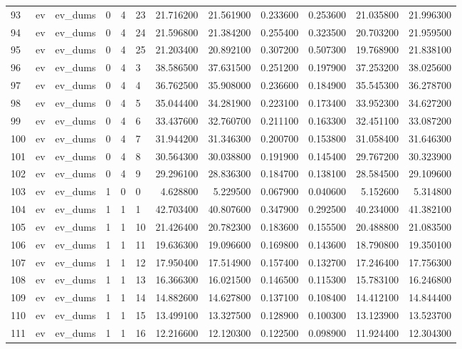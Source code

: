\begin{tabular}{llllllrrrrrr}
93 & ev & ev_dums & 0 & 4 & 23 & 21.716200 & 21.561900 & 0.233600 & 0.253600 & 21.035800 & 21.996300 \\
94 & ev & ev_dums & 0 & 4 & 24 & 21.596800 & 21.384200 & 0.255400 & 0.323500 & 20.703200 & 21.959500 \\
95 & ev & ev_dums & 0 & 4 & 25 & 21.203400 & 20.892100 & 0.307200 & 0.507300 & 19.768900 & 21.838100 \\
96 & ev & ev_dums & 0 & 4 & 3 & 38.586500 & 37.631500 & 0.251200 & 0.197900 & 37.253200 & 38.025600 \\
97 & ev & ev_dums & 0 & 4 & 4 & 36.762500 & 35.908000 & 0.236600 & 0.184900 & 35.545300 & 36.278700 \\
98 & ev & ev_dums & 0 & 4 & 5 & 35.044400 & 34.281900 & 0.223100 & 0.173400 & 33.952300 & 34.627200 \\
99 & ev & ev_dums & 0 & 4 & 6 & 33.437600 & 32.760700 & 0.211100 & 0.163300 & 32.451100 & 33.087200 \\
100 & ev & ev_dums & 0 & 4 & 7 & 31.944200 & 31.346300 & 0.200700 & 0.153800 & 31.058400 & 31.646300 \\
101 & ev & ev_dums & 0 & 4 & 8 & 30.564300 & 30.038800 & 0.191900 & 0.145400 & 29.767200 & 30.323900 \\
102 & ev & ev_dums & 0 & 4 & 9 & 29.296100 & 28.836300 & 0.184700 & 0.138100 & 28.584500 & 29.109600 \\
103 & ev & ev_dums & 1 & 0 & 0 & 4.628800 & 5.229500 & 0.067900 & 0.040600 & 5.152600 & 5.314800 \\
104 & ev & ev_dums & 1 & 1 & 1 & 42.703400 & 40.807600 & 0.347900 & 0.292500 & 40.234000 & 41.382100 \\
105 & ev & ev_dums & 1 & 1 & 10 & 21.426400 & 20.782300 & 0.183600 & 0.155500 & 20.488800 & 21.083500 \\
106 & ev & ev_dums & 1 & 1 & 11 & 19.636300 & 19.096600 & 0.169800 & 0.143600 & 18.790800 & 19.350100 \\
107 & ev & ev_dums & 1 & 1 & 12 & 17.950400 & 17.514900 & 0.157400 & 0.132700 & 17.246400 & 17.756300 \\
108 & ev & ev_dums & 1 & 1 & 13 & 16.366300 & 16.021500 & 0.146500 & 0.115300 & 15.783100 & 16.246800 \\
109 & ev & ev_dums & 1 & 1 & 14 & 14.882600 & 14.627800 & 0.137100 & 0.108400 & 14.412100 & 14.844400 \\
110 & ev & ev_dums & 1 & 1 & 15 & 13.499100 & 13.327500 & 0.128900 & 0.100300 & 13.123900 & 13.523700 \\
111 & ev & ev_dums & 1 & 1 & 16 & 12.216600 & 12.120300 & 0.122500 & 0.098900 & 11.924400 & 12.304300 \\

\end{tabular}
